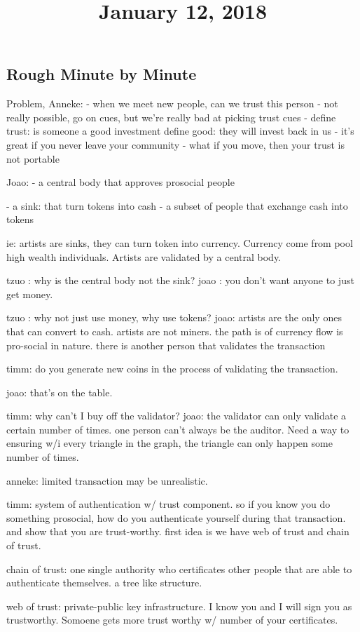 \title{January 12, 2018}

\subsection{Rough Minute by Minute}


Problem, Anneke:
	- when we meet new people, can we trust this person
	- not really possible, go on cues, but we're really bad at picking trust cues 
	- define trust: is someone a good investment
		define good: they will invest back in us
	- it's great if you never leave your community
	- what if you move, then your trust is not portable


Joao:
	- a central body that approves prosocial people

	- a sink: that turn tokens into cash 
		- a subset of people that exchange cash into tokens

		ie: artists are sinks, they can turn token into currency. Currency come from pool high wealth individuals. Artists are validated by a central body. 

tzuo : why is the central body not the sink?
joao : you don't want anyone to just get money. 

tzuo : why not just use money, why use tokens?
joao: artists are the only ones that can convert to cash.
	artists are not miners. the path is of currency flow is pro-social in nature. there is another person that validates the transaction

timm: do you generate new coins in the process of validating the transaction.

joao: that's on the table. 

timm: why can't I buy off the validator?
joao: the validator can only validate a certain number of times. one person can't always be the auditor. Need a way to ensuring w/i every triangle in the graph, the triangle can only happen some number of times. 

anneke: limited transaction may be unrealistic.

timm: system of authentication w/ trust component. so if you know you do something prosocial, how do you authenticate yourself during that transaction. and show that you are trust-worthy. first idea is we have web of trust and chain of trust.

chain of trust: one single authority who certificates other people that are able to authenticate themselves. a tree like structure. 

web of trust: private-public key infrastructure. I know you and I will sign you as trustworthy. Somoene gets more trust worthy w/ number of your certificates. 

